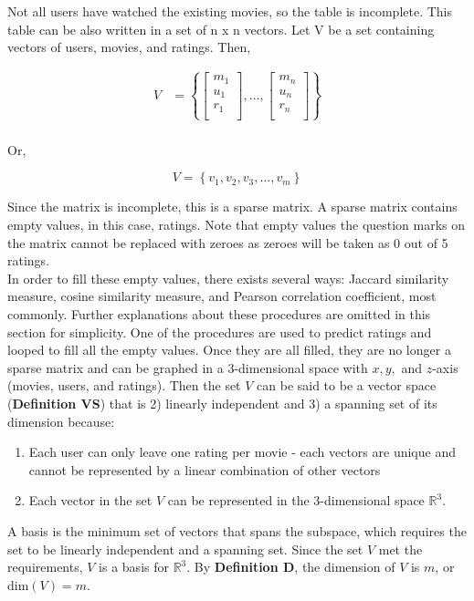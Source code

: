 \documentclass[paper=letter, fontsize=12pt]{scrartcl} %
\numberwithin{equation}{section} %
\numberwithin{figure}{section} %
\numberwithin{table}{section} %
\newcommand{\matxxx}[3] {
\begin{bmatrix}
  #1 \\
  #2 \\
  #3 \\
\end{bmatrix}
}
\begin{document}
  Not all users have watched the existing movies, so the table is incomplete.
  This table can be also written in a set of n x n vectors. Let V be a set
  containing vectors of users, movies, and ratings. Then,

  \[
    \begin{split}
      V & =
      \left\{
        \matxxx{m_1}{u_1}{r_1}, \dots, \matxxx{m_n}{u_n}{r_n}
      \right\} \\
    \end{split}
  \]
  \begin{center}
  Or,
  \end{center}
  \[
    V = \left\{ v_1, v_2, v_3, \dots, v_m \right\}
  \]

  Since the matrix is incomplete, this is a sparse matrix. A sparse matrix
  contains empty values, in this case, ratings. Note that empty values \textemdash the
  question marks on the matrix \textemdash cannot be replaced with zeroes as
  zeroes will be taken as 0 out of 5 ratings. \\

  In order to fill these empty values, there exists several ways: Jaccard
  similarity measure, cosine similarity measure, and Pearson correlation
  coefficient, most commonly. Further explanations about these procedures are
  omitted in this section for simplicity. One of the procedures are used to
  predict ratings and looped to fill all the empty values. Once they are all
  filled, they are no longer a sparse matrix and can be graphed in a
  3-dimensional space with \(x, y, \) and \(z\)-axis (movies, users, and ratings).
  Then the set \(V\) can be said to be a vector space (\textbf{Definition VS}) that is 2)
  linearly independent and 3) a spanning set of its dimension because:

  \begin{enumerate}
  \item Each user can only leave one rating per movie - each vectors are
    unique and cannot be represented by a linear combination of other vectors
  \item Each vector in the set \(V\) can be represented in the 3-dimensional
    space \(\mathbb{R}^{3}\).
  \end{enumerate}

  A basis is the minimum set of vectors that spans the subspace, which requires
  the set to be linearly independent and a spanning set. Since the set \(V\) met
  the requirements, \(V\) is a basis for \(\mathbb{R}^3\). By \textbf{Definition
    D}, the dimension of \(V\) is \(m\), or \(\mbox{dim}(V) = m\).
\end{document}
